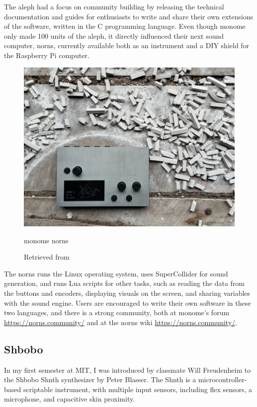 The aleph had a focus on community building by releasing the technical documentation and guides for enthusiasts to write and share their own extensions of the software, written in the C programming language. Even though monome only made 100 units of the aleph, it directly influenced their next sound computer, norns, currently available both as an instrument and a \acrshort{DIY} shield for the Raspberry Pi computer.

\begin{figure}[ht]
  \centering
  \includegraphics[width=0.75\linewidth,height=0.25\textheight,keepaspectratio]{images/monome-norns.jpg}
  \caption{monome norns}
  \caption*{Retrieved from \cite{website-monome-current}}
  \label{fig:monome-norns}
\end{figure}

The norns runs the Linux operating system, uses SuperCollider for sound generation, and runs Lua scripts for other tasks, such as reading the data from the buttons and encoders, displaying visuals on the screen, and sharing variables with the sound engine. Users are encouraged to write their own software in these two languages, and there is a strong community, both at monome's forum \url{https://norns.community/} and at the norns wiki \url{https://norns.community/}.

\subsection{Shbobo}

In my first semester at MIT, I was introduced by classmate Will Freudenheim \cite{website-will-freudenheim}  to the Shbobo Shnth synthesizer by Peter Blasser. The Shnth is a microcontroller-based scriptable instrument, with multiple input sensors, including flex sensors,  a microphone, and capacitive skin proximity.

